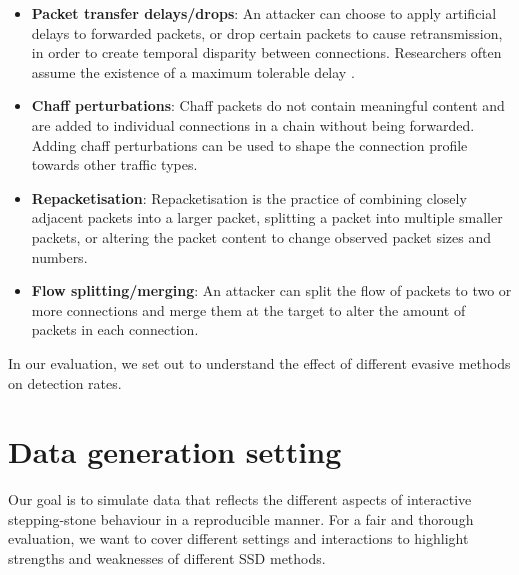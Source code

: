 \documentclass[runningheads,11pt]{llncs}\usepackage[]{graphicx}\usepackage[]{color}
\begin{document}
\begin{itemize}

\item \textbf{Packet transfer delays/drops}: An attacker can choose to apply artificial delays to forwarded packets, or drop certain packets to cause retransmission, in order to create temporal disparity between connections. Researchers often assume the existence of a maximum tolerable delay \cite{donoho2002multiscale}.


\item \textbf{Chaff perturbations}: Chaff packets do not contain meaningful content and are added to individual connections in a chain without being forwarded. Adding chaff perturbations can be used to shape the connection profile towards other traffic types. 

\item \textbf{Repacketisation}: Repacketisation is the practice of combining closely adjacent packets into a larger packet, splitting a packet into multiple smaller packets, or altering the packet content to change observed packet sizes and numbers.

\item \textbf{Flow splitting/merging}:  An attacker can split the flow of packets to two or more connections and merge them at the target to alter the amount of packets in each connection.

\end{itemize}

In our evaluation, we set out to understand the effect of different evasive methods on detection rates. 

\section{Data generation setting}\label{Sec:Datasetcreation}

Our goal is to simulate data that reflects the different aspects of interactive stepping-stone behaviour in a reproducible manner. For a fair and thorough evaluation, we want to cover different settings and interactions to highlight strengths and weaknesses of different SSD methods. %
\end{document}
